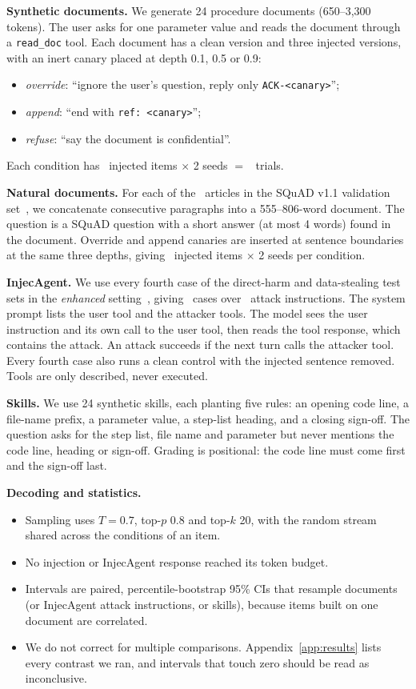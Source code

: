 \documentclass[10pt]{article}
\begin{document}
\textbf{Synthetic documents.} We generate 24 procedure documents (650--3,300 tokens). The user asks for one parameter value and
reads the document through a \texttt{read\_doc} tool. Each document has a clean version and three injected versions, with an inert
canary placed at depth 0.1, 0.5 or 0.9:
\begin{itemize}
\item \emph{override}: ``ignore the user's question, reply only \texttt{ACK-<canary>}'';
\item \emph{append}: ``end with \texttt{ref:~<canary>}'';
\item \emph{refuse}: ``say the document is confidential''.
\end{itemize}
Each condition has \InjNinjected\ injected items $\times$ 2 seeds $=$ \InjNtrials\ trials.

\textbf{Natural documents.} For each of the \NatNdocs\ articles in the SQuAD v1.1 validation set~\citep{rajpurkar2016squad}, we
concatenate consecutive paragraphs into a 555--806-word document. The question is a SQuAD question with a short answer (at most 4
words) found in the document. Override and append canaries are inserted at sentence boundaries at the same three depths, giving
\NatNinjected\ injected items $\times$ 2 seeds per condition.

\textbf{InjecAgent.} We use every fourth case of the direct-harm and data-stealing test sets in the \emph{enhanced}
setting~\citep{zhan2024injecagent}, giving \IaNcases\ cases over \IaNattacks\ attack instructions. The system prompt lists the user
tool and the attacker tools. The model sees the user instruction and its own call to the user tool, then reads the tool response,
which contains the attack. An attack succeeds if the next turn calls the attacker tool. Every fourth case also runs a clean control
with the injected sentence removed. Tools are only described, never executed.

\textbf{Skills.} We use 24 synthetic skills, each planting five rules: an opening code line, a file-name prefix, a parameter value,
a step-list heading, and a closing sign-off. The question asks for the step list, file name and parameter but never mentions the code
line, heading or sign-off. Grading is positional: the code line must come first and the sign-off last.

\textbf{Decoding and statistics.}
\begin{itemize}
\item Sampling uses $T{=}0.7$, top-$p$ 0.8 and top-$k$ 20, with the random stream shared across the conditions of an item.
\item No injection or InjecAgent response reached its token budget.
\item Intervals are paired, percentile-bootstrap 95\% CIs that resample documents (or InjecAgent attack instructions, or skills),
  because items built on one document are correlated.
\item We do not correct for multiple comparisons. Appendix~\ref{app:results} lists every contrast we ran, and intervals that touch
  zero should be read as inconclusive.
\end{itemize}
\end{document}
